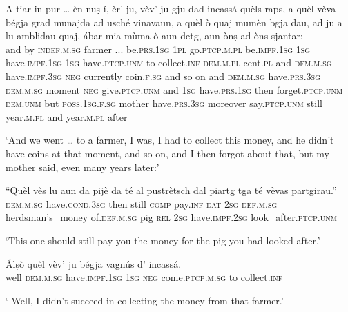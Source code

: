 \begin{linenumbers}
	\gll    A tiar in pur … èn\footnotemark{} nuṣ í, èr’ ju, vèv’ ju gju dad incassá quèls raps, a quèl vèva bégja grad  munajda ad usché vinavaun, a quèl ò quaj mumèn bgja dau, ad ju a lu amblidau quaj, ábar mia mùma ò aun detg, aun ònṣ ad òns sjantar: \\ 
	and by \textsc{indef.m.sg} farmer ... be.\textsc{prs.1sg} \textsc{1pl} go.\textsc{ptcp.m.pl}  be.\textsc{impf.1sg} \textsc{1sg}  have.\textsc{impf.1sg} \textsc{1sg} have.\textsc{ptcp.unm} to collect.\textsc{inf}  \textsc{dem.m.pl} cent.\textsc{pl} and \textsc{dem.m.sg} have.\textsc{impf.3sg}  \textsc{neg} currently coin.\textsc{f.sg} and so on and  \textsc{dem.m.sg} have.\textsc{prs.3sg} \textsc{dem.m.sg} moment \textsc{neg}  give.\textsc{ptcp.unm} and \textsc{1sg} have.\textsc{prs.1sg} then  forget.\textsc{ptcp.unm} \textsc{dem.unm} but \textsc{poss.1sg.f.sg} mother have.\textsc{prs.3sg} moreover  say.\textsc{ptcp.unm} still year.\textsc{m.pl} and year.\textsc{m.pl} after\\
\end{linenumbers}
	\medskip
	\glt `And we went … to a farmer, I was, I had to collect this money, and he didn’t have coins at that moment, and so on, and I then forgot about that, but my mother said, even many years later:'
	\medskip

\begin{linenumbers}
	\gll    “Quèl vès lu aun da pijè da té al pustrètsch dal piartg tga té vèvas partgirau.” \\
	\textsc{dem.m.sg} have.\textsc{cond.3sg} then still \textsc{comp} pay.\textsc{inf} \textsc{dat} \textsc{2sg} \textsc{def.m.sg} herdsman's\_money of.\textsc{def.m.sg} pig \textsc{rel} \textsc{2sg} have.\textsc{impf.2sg} look\_after.\textsc{ptcp.unm}\\
\end{linenumbers}
\medskip
	\glt `This one should still pay you the money for the pig you had looked after.'
	\medskip

\begin{linenumbers}
	\gll  Álṣò quèl vèv' ju bégja vagnús d’ incassá. \\
	well \textsc{dem.m.sg} have.\textsc{impf.1sg} \textsc{1sg} \textsc{neg} come.\textsc{ptcp.m.sg}  to collect.\textsc{inf}\\
\end{linenumbers}
	\medskip
	\glt ` Well, I didn’t succeed in collecting the money from that farmer.'
	\medskip


